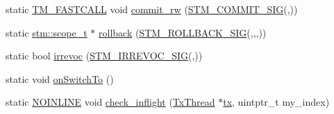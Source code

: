 \begin{DoxyCompactItemize}
static \hyperlink{platform_8hpp_a8b5d728e6eed8f368f9966f637d2f719}{T\-M\-\_\-\-F\-A\-S\-T\-C\-A\-L\-L} void \hyperlink{structanonymous__namespace_02ringsw_8cpp_03_1_1RingSW_acc8611cab40c42842640914a56c0fc9e}{commit\-\_\-rw} (\hyperlink{include_2stm_2macros_8hpp_a1b8304eb1082517c7dc31f3534b72343}{S\-T\-M\-\_\-\-C\-O\-M\-M\-I\-T\-\_\-\-S\-I\-G}(,))
\item 
static \hyperlink{namespacestm_a91badf88c88aacc831b01a315435a255}{stm\-::scope\-\_\-t} $\ast$ \hyperlink{structanonymous__namespace_02ringsw_8cpp_03_1_1RingSW_a021a26332ed437cf048c4b0435d294df}{rollback} (\hyperlink{include_2stm_2macros_8hpp_a1c36a48149c84f90d5bca01019950ca9}{S\-T\-M\-\_\-\-R\-O\-L\-L\-B\-A\-C\-K\-\_\-\-S\-I\-G}(,,,))
\item 
static bool \hyperlink{structanonymous__namespace_02ringsw_8cpp_03_1_1RingSW_a1945765f47f2bff2676768e31ecdb562}{irrevoc} (\hyperlink{include_2stm_2macros_8hpp_acf117c2df6442342f6603e1a12fa3b5c}{S\-T\-M\-\_\-\-I\-R\-R\-E\-V\-O\-C\-\_\-\-S\-I\-G}(,))
\item 
static void \hyperlink{structanonymous__namespace_02ringsw_8cpp_03_1_1RingSW_afab35678a1e955e3372c502315e751b7}{on\-Switch\-To} ()
\item 
static \hyperlink{platform_8hpp_a1b173d22e57d9395897acbd8de62d505}{N\-O\-I\-N\-L\-I\-N\-E} void \hyperlink{structanonymous__namespace_02ringsw_8cpp_03_1_1RingSW_acb3a9ef504ec0f34a7bbe88f56d90ba3}{check\-\_\-inflight} (\hyperlink{structstm_1_1TxThread}{Tx\-Thread} $\ast$\hyperlink{stmskip_8cc_a0f1c58699b83ce5a08bd9ee859250d72}{tx}, uintptr\-\_\-t my\-\_\-index)
\end{DoxyCompactItemize}


